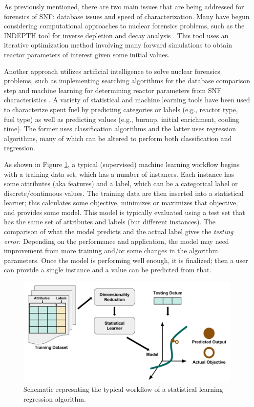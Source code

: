 As previously mentioned, there are two main issues that are being addressed for
forensics of \gls{SNF}: database issues and speed of characterization. Many
have begun considering computational approaches to nuclear forensics problems,
such as the INDEPTH tool for inverse depletion and decay analysis
\cite{weber_2006, weber_2010, weber_2011}. This tool uses an iterative
optimization method involving many forward simulations to obtain reactor
parameters of interest given some initial values. 

Another approach utilizes artificial intelligence to solve nuclear forensics
problems, such as implementing searching algorithms for the database comparison
step \cite{gey_search} and machine learning for determining reactor parameters
from \gls{SNF} characteristics \cite{dayman_feasibility_2013, nicolaou_2006,
nicolaou_2009, nicolaou_2014, robel_2009, jones_viz_2014, jones_snf_2014}.  A
variety of statistical and machine learning tools have been used to
characterize spent fuel by predicting categories or labels (e.g., reactor type, fuel
type) as well as predicting values (e.g., burnup, initial enrichment, cooling
time). The former uses classification algorithms and the latter uses regression
algorithms, many of which can be altered to perform both classification and 
regression.

As shown in Figure \ref{fig:supervised}, a typical (supervised) machine
learning workflow begins with a training data set, which has a number of
instances.  Each instance has some attributes (aka features) and a label, which
can be a categorical label or discrete/continuous values.  The training data
are then inserted into a statistical learner; this calculates some objective,
minimizes or maximizes that objective, and provides some model. This model is
typically evaluated using a test set that has the same set of attributes and
labels (but different instances). The comparison of what the model predicts and
the actual label gives the \textit{testing error}. Depending on the performance
and application, the model may need improvement from more training and/or some
changes in the algorithm parameters. Once the model is performing well enough,
it is finalized; then a user can provide a single instance and a value can be
predicted from that. 

\begin{figure}[h!]
  \includegraphics[width=\linewidth]{./chapters/intro/SupervisedRegression.png}
  \caption{Schematic represnting the typical workflow of a statistical learning regression algorithm.}
  \label{fig:supervised}
\end{figure}

